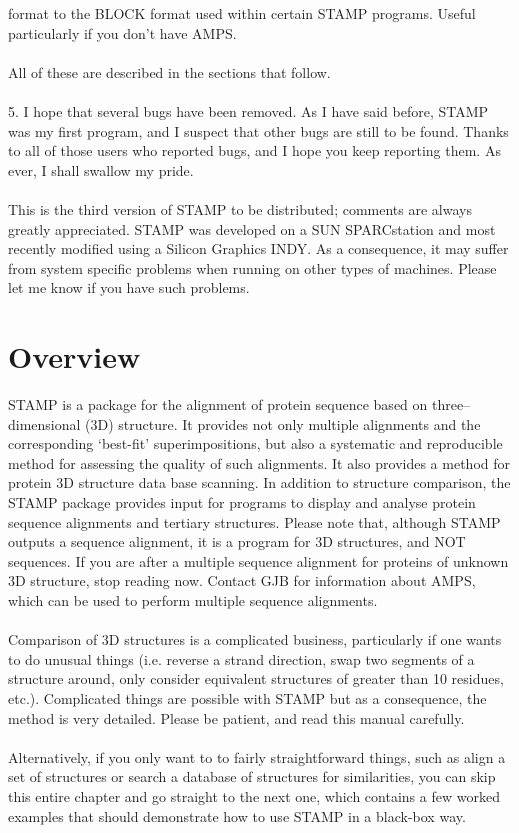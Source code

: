 format to the BLOCK format used within certain STAMP programs.  Useful
particularly if you don't have AMPS.\\
\\
All of these are described in the sections that follow.\\
\\
5. I hope that several bugs have been removed.  As I have said
before, STAMP was my first program, and I suspect that other bugs
are still to be found.  Thanks to all of those users who reported
bugs, and I hope you keep reporting them.  As ever, I shall swallow
my pride.\\
\\
This is the third version of STAMP to be distributed; comments are
always greatly appreciated.  STAMP was developed on a SUN
SPARCstation and most recently modified using a Silicon Graphics
INDY.   As a consequence, it may suffer from system specific
problems when running on other types of machines.   Please let me know if
you have such problems.


\section{Overview}

STAMP is a package for the alignment of protein sequence based on
three--dimensional (3D) structure.  It provides not only multiple
alignments and the corresponding `best-fit' superimpositions, but
also a systematic and reproducible method for assessing the
quality of such alignments.  It also provides a method for protein
3D structure data base scanning.  In addition to structure
comparison, the STAMP package provides input for programs to
display and analyse protein sequence alignments and tertiary structures.
Please note that, although STAMP outputs a sequence alignment, it is 
a program for 3D structures, and NOT sequences.  If 
you are after a multiple sequence alignment for proteins of unknown 3D 
structure, stop reading now.  Contact GJB for information
about AMPS, which can be used to perform multiple sequence
alignments.\\
\\
Comparison of 3D structures is a complicated
business, particularly if one wants to do unusual things (i.e.
reverse a strand direction, swap two segments of a structure
around, only consider equivalent structures of greater
than 10 residues, etc.).  Complicated things are possible with STAMP but
as a consequence, the method is very detailed.  Please be patient, and 
read this manual carefully.\\
\\
Alternatively, if you only want to to fairly straightforward things, such
as align a set of structures or search a database of structures for
similarities, you can skip this entire chapter and go straight to the
next one, which contains a few worked examples that should demonstrate how
to use STAMP in a black-box way.

